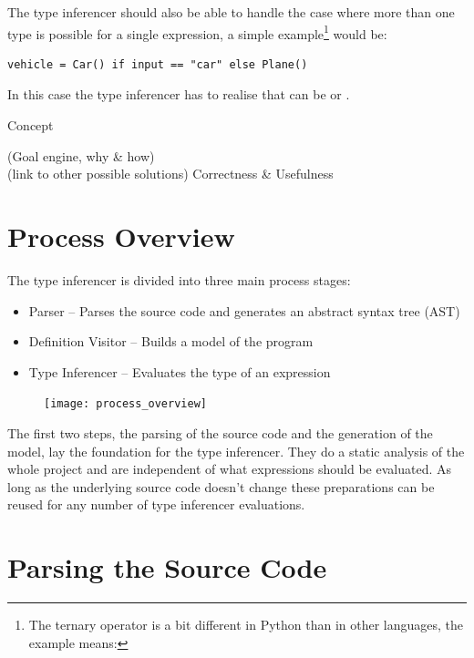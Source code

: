 \documentclass[12pt,halfparskip]{scrreprt}
\begin{document}
The type inferencer should also be able to handle the case where more than one type is possible for a single expression, a simple example\footnote{The ternary operator is a bit different in Python than in other languages, the example means: } would be:

\begin{lstlisting}
vehicle = Car() if input == "car" else Plane()
\end{lstlisting}

In this case the type inferencer has to realise that  can be  or .

{Concept}

(Goal engine, why \& how) \\
(link to other possible solutions)
Correctness \& Usefulness


\section{Process Overview}

The type inferencer is divided into three main process stages:

\begin{itemize}
	\item Parser – Parses the source code and generates an abstract syntax tree (AST)
	\item Definition Visitor – Builds a model of the program
	\item Type Inferencer – Evaluates the type of an expression
\end{itemize}

\begin{figure}[h!]
 \centering
 \texttt{[image: process\_overview]}
 \label{fig:process_overview}
\end{figure}

The first two steps, the parsing of the source code and the generation of the model, lay the foundation for the type inferencer. They do a static analysis of the whole project and are independent of what expressions should be evaluated. As long as the underlying source code doesn't change these preparations can be reused for any number of type inferencer evaluations.


\section{Parsing the Source Code}
\end{document}
